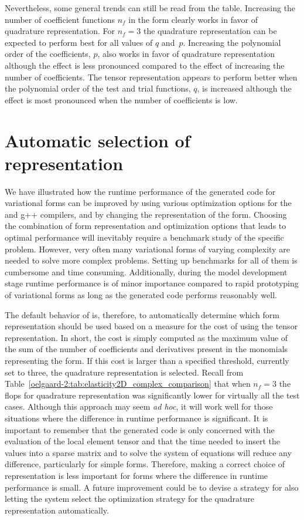 Nevertheless, some general trends can still be read from the table.
Increasing the number of coefficient functions $n_f$ in the form
clearly works in favor of quadrature representation.  For $n_{f}=3$
the quadrature representation can be expected to perform best for all
values of $q$ and~$p$.  Increasing the polynomial order of
the coefficients, $p$, also works in favor of quadrature representation
although the effect is less pronounced compared to the effect of
increasing the number of coefficients.  The tensor representation
appears to perform better when the polynomial order of the test and
trial functions, $q$, is increased although the effect is most
pronounced when the number of coefficients is low.

\section{Automatic selection of representation}

We have illustrated how the runtime performance of the generated code
for variational forms can be improved by using various optimization
options for the \ffc{} and g++ compilers, and by changing the
representation of the form.  Choosing the combination of form
representation and optimization options that leads to optimal
performance will inevitably require a benchmark study of the specific
problem.  However, very often many variational forms of varying
complexity are needed to solve more complex problems. Setting up
benchmarks for all of them is cumbersome and time consuming.
Additionally, during the model development stage runtime performance
is of minor importance compared to rapid prototyping of variational
forms as long as the generated code performs reasonably well.

The default behavior of \ffc{} is, therefore, to automatically
determine which form representation should be used based on a measure
for the cost of using the tensor representation.  In short, the cost
is simply computed as the maximum value of the sum of the number of
coefficients and derivatives present in the monomials representing the
form.  If this cost is larger than a specified threshold, currently
set to three, the quadrature representation is selected.  Recall from
Table~\ref{oelgaard-2:tab:elasticity2D_complex_comparison} that when
$n_f=3$ the flops for quadrature representation was significantly
lower for virtually all the test cases.  Although this approach may
seem \emph{ad hoc}, it will work well for those situations where the
difference in runtime performance is significant.  It is important to
remember that the generated code is only concerned with the evaluation
of the local element tensor and that the time needed to insert the
values into a sparse matrix and to solve the system of equations will
reduce any difference, particularly for simple forms.  Therefore,
making a correct choice of representation is less important for forms
where the difference in runtime performance is small.  A future
improvement could be to devise a strategy for also letting the system
select the optimization strategy for the quadrature representation
automatically.
